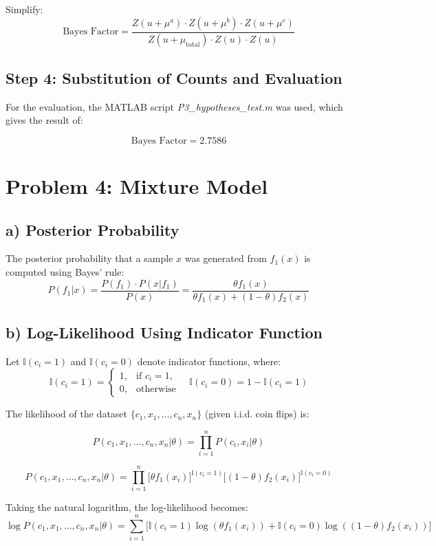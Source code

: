 \documentclass{article}
\begin{document}
Simplify:
\[
\text{Bayes Factor} = \frac{Z(u + \mu^a) \cdot Z(u + \mu^b) \cdot Z(u + \mu^c)}{Z(u + \mu_{\text{total}})  \cdot Z(u) \cdot Z(u) }
\]

\subsection*{Step 4: Substitution of Counts and Evaluation}

For the evaluation, the MATLAB script \textit{P3\_hypotheses\_test.m} was used, which gives the result of:

\[
\text{Bayes Factor} = 2.7586
\]

\section*{Problem 4: Mixture Model}

\subsection*{a) Posterior Probability}
The posterior probability that a sample \( x \) was generated from \( f_1(x) \) is computed using Bayes' rule:
\[
P(f_1 | x) = \frac{P(f_1) \cdot P(x | f_1)}{P(x)} = \frac{\theta f_1(x)}{\theta f_1(x) + (1 - \theta) f_2(x)}
\]

\subsection*{ b) Log-Likelihood Using Indicator Function}
Let \( \mathbb{I}(c_i = 1) \) and \( \mathbb{I}(c_i = 0) \) denote indicator functions, where:
\[
\mathbb{I}(c_i = 1) =
\begin{cases}
1, & \text{if } c_i = 1, \\
0, & \text{otherwise}
\end{cases}
\quad
\mathbb{I}(c_i = 0) = 1 - \mathbb{I}(c_i = 1)
\]

The likelihood of the dataset \( \{c_1, x_1, \dots, c_n, x_n\} \) (given i.i.d. coin flips) is:

\[
P(c_1, x_1, \dots, c_n, x_n | \theta) = \prod_{i=1}^n P(c_i, x_i| \theta)
\]

\[
P(c_1, x_1, \dots, c_n, x_n | \theta) = \prod_{i=1}^n \big[ \theta f_1(x_i) \big]^{\mathbb{I}(c_i = 1)} \big[ (1 - \theta) f_2(x_i) \big]^{\mathbb{I}(c_i = 0)}
\]

Taking the natural logarithm, the log-likelihood becomes:
\[
\log P(c_1, x_1, \dots, c_n, x_n | \theta) =
\sum_{i=1}^n \big[ \mathbb{I}(c_i = 1) \log (\theta f_1(x_i)) + \mathbb{I}(c_i = 0) \log ((1 - \theta) f_2(x_i)) \big]
\]
\end{document}
